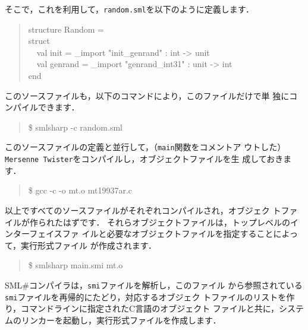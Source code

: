 \documentclass{jbook}
\newcommand{\smlsharp}{SML\#}
\newcommand{\myem}{\mbox{\ \ }}
\newenvironment{program}{\begin{quote}\begin{tt}}%
                        {\end{tt}\end{quote}}
\begin{document}
	そこで，これを利用して，{\tt random.sml}を以下のように定義します．
\begin{program}
structure Random =\\
struct\\
\myem  val init = \_import "init\_genrand" : int -> unit\\
\myem  val genrand = \_import "genrand\_int31" : unit -> int\\
end
\end{program}
	このソースファイルも，以下のコマンドにより，このファイルだけで単
独にコンパイルできます．
\begin{program}
\$ smlsharp -c random.sml
\end{program}
	このソースファイルの定義と並行して，（{\tt main}関数をコメントア
ウトした）{\tt Mersenne Twister}をコンパイルし，オブジェクトファイルを生
成しておきます．
\begin{program}
\$ gcc -c -o mt.o mt19937ar.c
\end{program}
	以上ですべてのソースファイルがそれぞれコンパイルされ，オブジェク
トファイルが作られたはずです．
	それらオブジェクトファイルは，トップレベルのインターフェイスファ
イルと必要なオブジェクトファイルを指定することによって，実行形式ファイル
が作成されます．
\begin{program}
\$ smlsharp main.smi mt.o
\end{program}
	\smlsharp{}コンパイラは，{\tt smi}ファイルを解析し，このファイル
から参照されている{\tt smi}ファイルを再帰的にたどり，対応するオブジェク
トファイルのリストを作り，コマンドラインに指定されたC言語のオブジェクト
ファイルと共に，システムのリンカーを起動し，実行形式ファイルを作成します．
	
\end{document}
